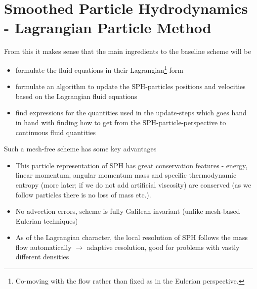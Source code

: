 \section{Smoothed Particle Hydrodynamics - Lagrangian Particle Method}
\thispagestyle{plain}

From this it makes sense that the main ingredients to the baseline scheme will be
\begin{itemize}
    \item formulate the fluid equations in their Lagrangian\footnote{Co-moving with the flow rather than fixed as in the Eulerian perspective.} form
    \item formulate an algorithm to update the SPH-particles positions and velocities based on the Lagrangian fluid equations
    \item find expressions for the quantities used in the update-steps which goes hand in hand with finding how to get from the SPH-particle-perspective to continuous fluid quantities
\end{itemize}

Such a mesh-free scheme has \textcolor{green1}{some key advantages}
\begin{itemize}
    \item This particle representation of SPH has great conservation features - energy, linear momentum, angular momentum mass and specific thermodynamic entropy (more later; if we do not add artificial viscosity) are conserved (as we follow particles there is no loss of mass etc.).
    \item No advection errors, scheme is fully Galilean invariant (unlike mesh-based Eulerian techniques)
    \item As of the Lagrangian character, the local resolution of SPH follows the mass flow automatically $\rightarrow$ adaptive resolution, good for problems with vastly different densities
\end{itemize}


